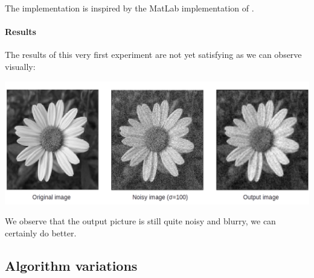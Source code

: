 \documentclass[]{article}
\begin{document}
The implementation is inspired by the MatLab implementation of \cite{glide_2014}.

\paragraph{Results}
The results of this very first experiment are not yet satisfying as we can observe visually:

\includegraphics[width=\textwidth]{img/firstimpl.png} %

We observe that the output picture is still quite noisy and blurry, we can certainly do better.

\subsection{Algorithm variations}
\end{document}
